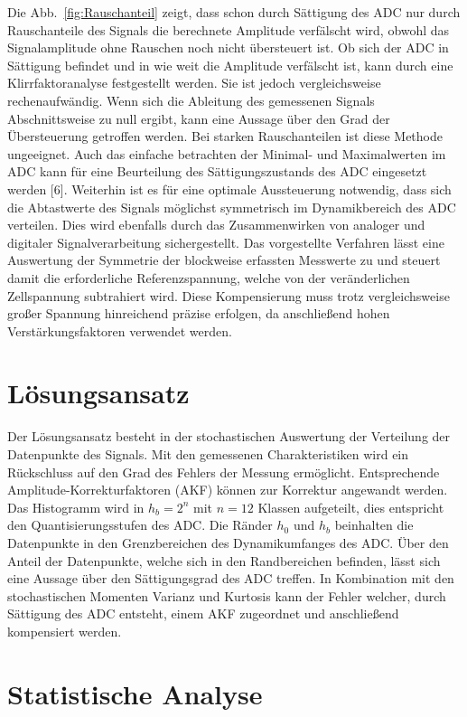 Die Abb.~\ref{fig:Rauschanteil} zeigt, dass schon durch Sättigung des ADC nur durch Rauschanteile des Signals die berechnete Amplitude verfälscht wird, obwohl das Signalamplitude ohne Rauschen noch nicht übersteuert ist. Ob sich der ADC in Sättigung befindet und in wie weit die Amplitude verfälscht ist, kann durch eine Klirrfaktoranalyse festgestellt werden. Sie ist jedoch vergleichsweise rechenaufwändig. Wenn sich die Ableitung des gemessenen Signals Abschnittsweise zu null ergibt, kann eine Aussage über den Grad der Übersteuerung getroffen werden. Bei starken Rauschanteilen ist diese Methode ungeeignet. Auch das einfache betrachten der Minimal- und Maximalwerten im ADC kann für eine Beurteilung des Sättigungszustands des ADC eingesetzt werden [6].
Weiterhin ist es für eine optimale Aussteuerung notwendig, dass sich die Abtastwerte des Signals möglichst symmetrisch im Dynamikbereich des ADC verteilen. Dies wird ebenfalls durch das Zusammenwirken von analoger und digitaler Signalverarbeitung sichergestellt. Das vorgestellte Verfahren lässt eine Auswertung der Symmetrie der blockweise erfassten Messwerte zu und steuert damit die erforderliche Referenzspannung, welche von der veränderlichen Zellspannung subtrahiert wird. Diese Kompensierung muss trotz vergleichsweise großer Spannung hinreichend präzise erfolgen, da anschließend hohen Verstärkungsfaktoren verwendet werden.

\section{Lösungsansatz}

Der Lösungsansatz besteht in der stochastischen Auswertung der Verteilung der Datenpunkte des Signals. Mit den gemessenen Charakteristiken wird ein Rückschluss auf den Grad des Fehlers der Messung ermöglicht. Entsprechende Amplitude-Korrekturfaktoren (AKF) können zur Korrektur angewandt werden. Das Histogramm wird in $h_b = 2^n$ mit $n = 12$ Klassen aufgeteilt, dies entspricht den Quantisierungsstufen des ADC. Die Ränder $h_0$ und $h_b$ beinhalten die Datenpunkte in den Grenzbereichen des Dynamikumfanges des ADC. Über den Anteil der Datenpunkte, welche sich in den Randbereichen befinden, lässt sich eine Aussage über den Sättigungsgrad des ADC treffen. In Kombination mit den stochastischen Momenten Varianz und Kurtosis kann der Fehler welcher, durch Sättigung des ADC entsteht, einem AKF zugeordnet und anschließend kompensiert werden.  

\section{Statistische Analyse}

